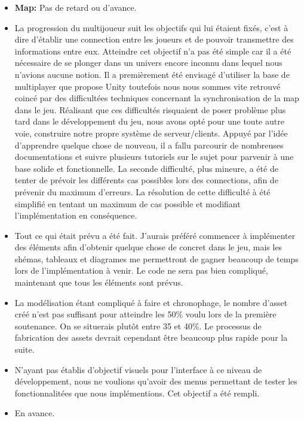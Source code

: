 \documentclass[12pt]{report}
\begin{document}
\begin{itemize}
\item \textbf{Map:} Pas de retard ou d'avance.
\item {} La progression du multijoueur suit les objectifs qui lui étaient fixés, c’est à dire d’établir une connection entre les joueurs et de pouvoir transmettre des informations entre eux. Atteindre cet objectif n’a pas été simple car il a été nécessaire de se plonger dans un univers encore inconnu dans lequel nous n’avions aucune notion. Il a premièrement été envisagé d’utiliser la base de multiplayer que propose Unity toutefois nous nous sommes vite retrouvé coincé par des difficultées techniques concernant la synchronisation de la map dans le jeu. Réalisant que ces difficultés risquaient de poser problème plus tard dans le développement du jeu, nous avons opté pour une toute autre voie, construire notre propre système de serveur/clients. Appuyé par l’idée d’apprendre quelque chose de nouveau, il a fallu parcourir de nombreuses documentations et suivre plusieurs tutoriels sur le sujet pour parvenir à une base solide et fonctionnelle. La seconde difficulté, plus mineure, a été de tenter de prévoir les différents cas possibles lors des connections, afin de prévenir du maximum d’erreurs. La résolution de cette difficulté à été simplifié en tentant un maximum de cas possible et modifiant l’implémentation en conséquence.
\item {} Tout ce qui était prévu a été fait. J'aurais préféré commencer à implémenter des éléments afin d'obtenir quelque chose de concret dans le jeu, mais les shémas, tableaux et diagrames me permettront de gagner beaucoup de temps lors de l'implémentation à venir. Le code ne sera pas bien compliqué, maintenant que tous les éléments sont prévus.
\item {} La modélisation étant compliqué à faire et chronophage, le nombre d’asset créé n’est pas suffisant pour atteindre les 50\% voulu lors de la première soutenance. On se situerais plutôt entre 35 et 40\%. Le processus de fabrication des assets devrait cependant être beaucoup plus rapide pour la suite.
\item {} N’ayant pas établis d’objectif visuels pour l’interface à ce niveau de développement, nous ne voulions qu’avoir des menus permettant de tester les fonctionnalitées que nous implémentions. Cet objectif a été rempli.
\item {} En avance.
\end{itemize}
\end{document}
